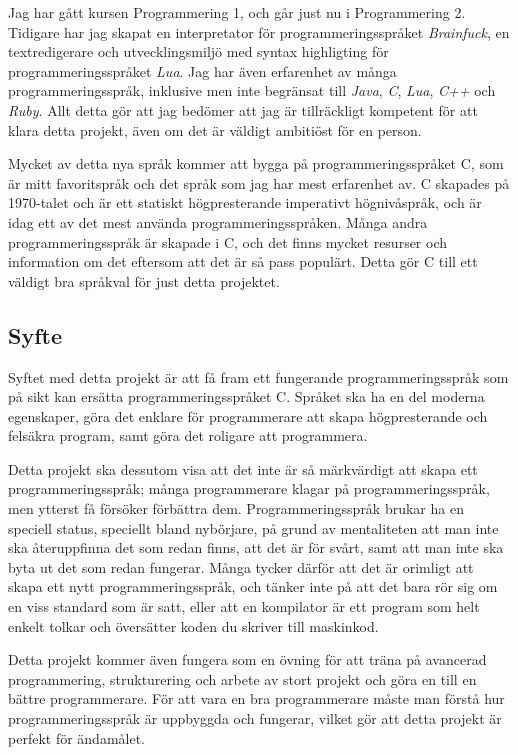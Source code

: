\documentclass{theme}
\begin{document}
Jag har gått kursen Programmering 1, och går just nu i Programmering 2. 
Tidigare har jag skapat en interpretator för programmeringsspråket 
\textit{Brainfuck}, en textredigerare och utvecklingsmiljö med syntax 
highligting för programmeringsspråket \textit{Lua}. Jag har även
erfarenhet av många programmeringsspråk, inklusive men inte begränsat till
\textit{Java}, \textit{C}, \textit{Lua}, \textit{C++} och \textit{Ruby}. Allt 
detta gör att jag bedömer att jag är tillräckligt kompetent för att klara detta 
projekt, även om det är väldigt ambitiöst för en person. 

Mycket av detta nya språk kommer att bygga på programmeringsspråket C, som är 
mitt favoritspråk och det språk som jag har mest erfarenhet av. C skapades på
1970-talet och är ett statiskt högpresterande imperativt högnivåspråk, och är 
idag ett av det mest använda programmeringsspråken. Många andra 
programmeringsspråk är skapade i C, och det finns mycket resurser och 
information om det eftersom att det är så pass populärt. Detta gör C till ett 
väldigt bra språkval för just detta projektet. 

\subsection{Syfte}

Syftet med detta projekt är att få fram ett fungerande programmeringsspråk som
på sikt kan ersätta programmeringsspråket C. Språket ska ha en del moderna 
egenskaper, göra det enklare för programmerare att skapa högpresterande
och felsäkra program, samt göra det roligare att programmera. 

Detta projekt ska dessutom visa att det inte är så märkvärdigt att skapa ett 
programmeringsspråk; många programmerare klagar på programmeringsspråk, men 
ytterst få försöker förbättra dem. Programmeringsspråk brukar ha en speciell 
status, speciellt bland nybörjare, på grund av mentaliteten att man inte ska 
återuppfinna det som redan finns, att det är för svårt, samt att man inte ska 
byta ut det som redan fungerar. Många tycker därför att det är orimligt att 
skapa ett nytt programmeringsspråk, och tänker inte på att det bara rör sig om 
en viss standard som är satt, eller att en kompilator är ett program som helt 
enkelt tolkar och översätter koden du skriver till maskinkod. 

Detta projekt kommer även fungera som en övning för att träna på avancerad 
programmering, strukturering och arbete av stort projekt och göra en till en 
bättre programmerare. För att vara en bra programmerare måste man förstå hur 
programmeringsspråk är uppbyggda och fungerar, vilket gör att detta projekt är 
perfekt för ändamålet.
\end{document}

